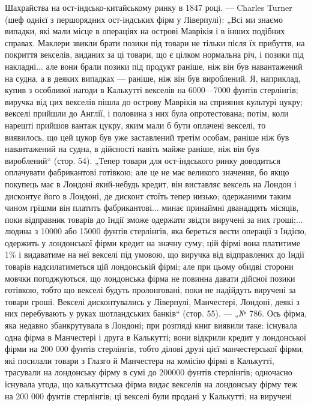 Шахрайства на ост-індсько-китайському ринку в 1847 році. — Charles
Turner (шеф однієї з першорядних ост-індських фірм у Ліверпулі): „Всі ми
знаємо випадки, які мали місце в операціях на острові Маврікія і в інших
подібних справах. Маклери звикли брати позики під товари не тільки після
їх прибуття, на покриття векселів, виданих за ці товари, що є цілком нормальна річ, і позики під
накладні... але вони брали позики під продукт раніше,
ніж він був навантажений на судна, а в деяких випадках — раніше, ніж він був
вироблений. Я, наприклад, купив з особливої нагоди в Калькутті векселів на 6000—7000 фунтів
стерлінгів; виручка від цих векселів пішла до острову Маврікія
на сприяння культурі цукру; векселі прийшли до Англії, і половина з них була
опротестована; потім, коли нарешті прийшов вантаж цукру, яким мали б бути
оплачені векселі, то виявилось, що цей цукор був уже заставлений третім особам,
раніше ніж був навантажений на судна, в дійсності навіть майже раніше, ніж він
був вироблений“ (стор. 54). „Тепер товари для ост-індського ринку доводиться
оплачувати фабрикантові готівкою; але це не має великого значення, бо якщо покупець має в Лондоні
який-небудь кредит, він виставляє вексель на Лондон
і дисконтує його в Лондоні, де дисконт стоїть тепер низько; одержаними таким
чином грішми він платить фабрикантові... минає принаймні дванадцять місяців,
поки відправник товарів до Індії зможе одержати звідти виручені за них гроші;...
людина з 10000 або 15000 фунтів стерлінгів, яка береться вести операції з Індією, одержить у
лондонської фірми кредит на значну суму; цій фірмі вона платитиме 1\% і видаватиме на неї векселі під
умовою, що виручка від відправлених до
Індії товарів надсилатиметься цій лондонській фірмі; але при цьому обидві сторони мовчки
погоджуються, що лондонська фірма не повинна давати дійсної
позики готівкою, тобто що векселі будуть пролонговані, поки не надійдуть виручені за товари гроші.
Векселі дисконтувались у Ліверпулі, Манчестері, Лондоні, деякі з них перебувають у руках
шотландських банків“ (стор. 55). — „№ 786.
Ось фірма, яка недавно збанкрутувала в Лондоні; при розгляді книг виявили таке:
існувала одна фірма в Манчестері і друга в Калькутті; вони відкрили кредит
у лондонської фірми на 200 000 фунтів стерлінгів, тобто ділові друзі цієї манчестерської фірми, які
посилали товари з Глазго й Манчестера на комісію фірмі в Калькутті, трасували на лондонську фірму в
сумі до 200000 фунтів стерлінгів; одночасно існувала угода, що калькуттська фірма видає векселів на
лондонську фірму теж на 200 000 фунтів стерлінгів; ці векселі були продані у Калькутті; на виручені
